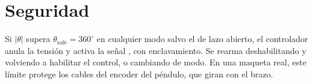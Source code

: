 \section{Seguridad}

Si $|\theta|$ supera $\theta_{\text{safe}}=360^\circ$ en cualquier modo salvo el de lazo abierto, el controlador anula la tensión y activa la señal , con enclavamiento. Se rearma deshabilitando y volviendo a habilitar el control, o cambiando de modo. En una maqueta real, este límite protege los cables del encoder del péndulo, que giran con el brazo.
